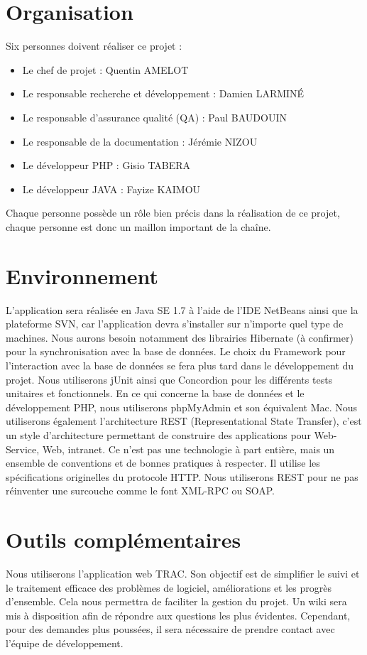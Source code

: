 \documentclass[12pt,a4paper,article]{memoir} %
\begin{document}
\section{Organisation}
Six personnes doivent réaliser ce projet :
\begin{itemize}
\item Le chef de projet : Quentin AMELOT
\item Le responsable recherche et développement : Damien LARMINÉ
\item Le responsable d’assurance qualité (QA) : Paul BAUDOUIN
\item Le responsable de la documentation : Jérémie NIZOU
\item Le développeur PHP : Gisio TABERA
\item Le développeur JAVA : Fayize KAIMOU
\end{itemize}
Chaque personne possède un rôle bien précis dans la réalisation de ce projet, chaque personne
est donc un maillon important de la chaîne.

\section{Environnement}
L'application sera réalisée en Java SE 1.7 à l'aide de l’IDE NetBeans ainsi que la plateforme
SVN, car l'application devra s'installer sur n'importe quel type de machines.
Nous aurons besoin notamment des librairies Hibernate (à confirmer) pour la synchronisation
avec la base de données. Le choix du Framework pour l’interaction avec la base de données se
fera plus tard dans le développement du projet.
Nous utiliserons jUnit ainsi que Concordion pour les différents tests unitaires et fonctionnels.
En ce qui concerne la base de données et le développement PHP, nous utiliserons
phpMyAdmin et son équivalent Mac.
Nous utiliserons également l’architecture REST (Representational State Transfer), c’est un
style d’architecture permettant de construire des applications pour Web-Service, Web,
intranet. Ce n’est pas une technologie à part entière, mais un ensemble de conventions et de
bonnes pratiques à respecter. Il utilise les spécifications originelles du protocole HTTP.
Nous utiliserons REST pour ne pas réinventer une surcouche comme le font XML-RPC ou
SOAP.

\section{Outils complémentaires}
Nous utiliserons l’application web TRAC. Son objectif est de simplifier le suivi et le
traitement efficace des problèmes de logiciel, améliorations et les progrès d’ensemble. Cela
nous permettra de faciliter la gestion du projet.
Un wiki sera mis à disposition afin de répondre aux questions les plus évidentes. Cependant,
pour des demandes plus poussées, il sera nécessaire de prendre contact avec l’équipe de
développement.
\end{document}
